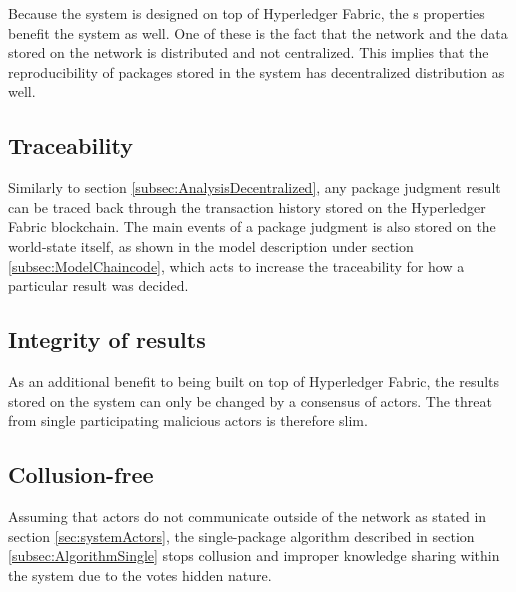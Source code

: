 Because the system is designed on top of Hyperledger Fabric, the s properties benefit the system as well. One of these is the fact that the network and the data stored on the network is distributed and not centralized. This implies that the reproducibility of packages stored in the system has decentralized distribution as well.

\subsection{Traceability}
\label{subsec:AnalysisTraceability}

Similarly to section \ref{subsec:AnalysisDecentralized}, any package judgment result can be traced back through the transaction history stored on the Hyperledger Fabric blockchain. The main events of a package judgment is also stored on the world-state itself, as shown in the model description under section \ref{subsec:ModelChaincode}, which acts to increase the traceability for how a particular result was decided.

\subsection{Integrity of results}
\label{subsec:AnalysisIntegrity}

As an additional benefit to being built on top of Hyperledger Fabric, the results stored on the system can only be changed by a consensus of actors. The threat from single participating malicious actors is therefore slim.

\subsection{Collusion-free}
\label{subsec:AnalysisCollusionFree}

Assuming that actors do not communicate outside of the network as stated in section \ref{sec:systemActors}, the single-package algorithm described in section \ref{subsec:AlgorithmSingle} stops collusion and improper knowledge sharing within the system due to the votes hidden nature.